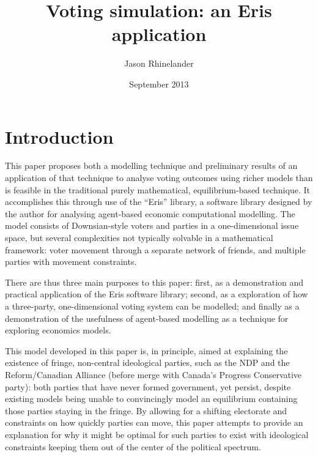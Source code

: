 \documentclass[12pt]{article}
\title{Voting simulation: an Eris application}
\date{September 2013}
\author{Jason Rhinelander}
\numberwithin{equation}{subsection}
\begin{document}
\maketitle
\thispagestyle{empty}



\section{Introduction}\label{s:intro}

This paper proposes both a modelling technique and preliminary results of an application of that
technique to analyse voting outcomes using richer models than is feasible in the traditional purely
mathematical, equilibrium-based technique.  It accomplishes this through use of the ``Eris''
library, a software library designed by the author for analysing agent-based economic computational
modelling.  The model consists of Downsian-style voters and parties in a one-dimensional issue
space, but several complexities not typically solvable in a mathematical framework: voter movement
through a separate network of friends, and multiple parties with movement constraints.

There are thus three main purposes to this paper: first, as a demonstration and practical
application of the Eris software library; second, as a exploration of how a three-party,
one-dimensional voting system can be modelled; and finally as a demonstration of the
usefulness of agent-based modelling as a technique for exploring economics models.

This model developed in this paper is, in principle, aimed at explaining the existence of fringe,
non-central ideological parties, such as the NDP and the Reform/Canadian Alliance (before merge with
Canada's Progress Conservative party): both parties that have never formed government, yet persist,
despite existing models being unable to convincingly model an equilibrium containing those parties
staying in the fringe.  By allowing for a shifting electorate and constraints on how quickly parties
can move, this paper attempts to provide an explanation for why it might be optimal for such parties
to exist with ideological constraints keeping them out of the center of the political spectrum.
\end{document}
